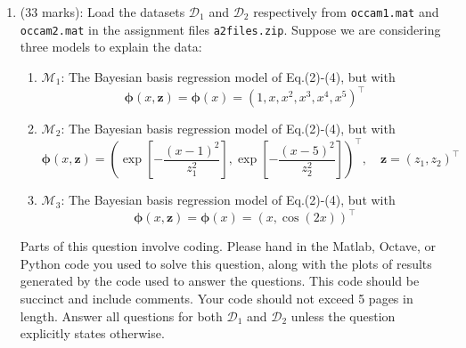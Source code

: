 \documentclass[11pt]{article}
\newcommand{\mbf}[1]{{\boldsymbol{\mathbf{#1}}}}
\renewcommand{\bm}{\mbf}
\begin{document}
\begin{enumerate}
\item (33 marks): Load the datasets $\mathcal{D}_1$ and $\mathcal{D}_2$ respectively from \texttt{occam1.mat} and \texttt{occam2.mat} in the assignment files \texttt{a2files.zip}.  Suppose we are considering three models to explain the data:
\begin{enumerate}[label=(\roman*)]
\item $\mathcal{M}_1$: The Bayesian basis regression model of Eq.(2)-(4), but with 
\begin{equation}
\bm{\phi}(x,\bm{z}) = \bm{\phi}(x) = (1,x,x^2,x^3,x^4,x^5)^{\top}
\end{equation}
\item $\mathcal{M}_2$: The Bayesian basis regression model of Eq.(2)-(4), but with 
\begin{equation}
\bm{\phi}(x,\bm{z}) =  \left( \exp[-\frac{(x-1)^2}{z_1^2}], \exp[-\frac{(x-5)^2}{z_2^2}] \right)^{\top}, \quad \bm{z} = (z_1,z_2)^{\top}
\end{equation}
\item $\mathcal{M}_3$: The Bayesian basis regression model of Eq.(2)-(4), but with 
\begin{equation}
\bm{\phi}(x,\bm{z}) =  \bm{\phi}(x) = (x,\cos(2x))^{\top}
\end{equation}
\end{enumerate}
Parts of this question involve coding.  Please hand in the Matlab, Octave, or Python code you used to solve this question, along with the plots of results generated by the code used to answer the questions.  This code should be succinct and include comments.  Your code should not exceed 5 pages in length.   Answer all questions for both $\mathcal{D}_1$ and $\mathcal{D}_2$ unless the question explicitly states otherwise.


\end{enumerate}
\end{document}
